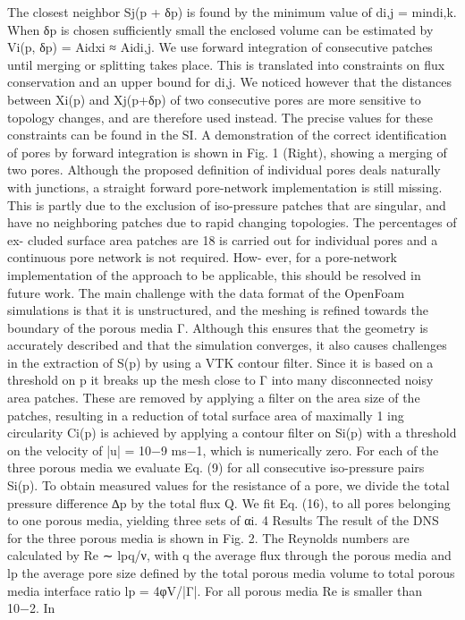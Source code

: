 The closest neighbor Sj(p + δp) is found by the minimum value of di,j = min{di,k}. When δp is chosen sufficiently small the enclosed volume can be estimated by Vi(p, δp) = Aidxi ≈ Aidi,j. We use forward integration of consecutive patches until merging or splitting takes place. This is translated into constraints on flux conservation and an upper bound for di,j. We noticed however that the distances between Xi(p) and Xj(p+δp)
of two consecutive pores are more sensitive to topology changes, and are therefore used instead. The precise values for these constraints can be found in the SI. A demonstration of the correct identification of pores by forward integration is shown in Fig. 1 (Right), showing a merging of two pores. Although the proposed definition of individual pores deals naturally with junctions, a straight forward pore-network implementation is still missing. This is partly due to the exclusion of iso-pressure patches that are singular, and have no neighboring patches due to rapid changing topologies. The percentages of ex- cluded surface area patches are 18%
is carried out for individual pores and a continuous pore network is not required. How- ever, for a pore-network implementation of the approach to be applicable, this should
be resolved in future work.
The main challenge with the data format of the OpenFoam simulations is that it
is unstructured, and the meshing is refined towards the boundary of the porous media
Γ. Although this ensures that the geometry is accurately described and that the simulation converges, it also causes challenges in the extraction of S(p) by using a VTK contour filter. Since it is based on a threshold on p it breaks up the mesh close to Γ into many disconnected noisy area patches. These are removed by applying a filter on the area size
of the patches, resulting in a reduction of total surface area of maximally 1%
ing circularity Ci(p) is achieved by applying a contour filter on Si(p) with a threshold
on the velocity of |u| = 10−9 ms−1, which is numerically zero.
For each of the three porous media we evaluate Eq. (9) for all consecutive iso-pressure pairs Si(p). To obtain measured values for the resistance of a pore, we divide the total pressure difference ∆p by the total flux Q. We fit Eq. (16), to all pores belonging to one porous media, yielding three sets of αi.
4 Results
The result of the DNS for the three porous media is shown in Fig. 2. The Reynolds numbers are calculated by Re ∼ lpq/ν, with q the average flux through the porous media and lp the average pore size defined by the total porous media volume to total porous media interface ratio lp = 4φV/|Γ|. For all porous media Re is smaller than 10−2. In
